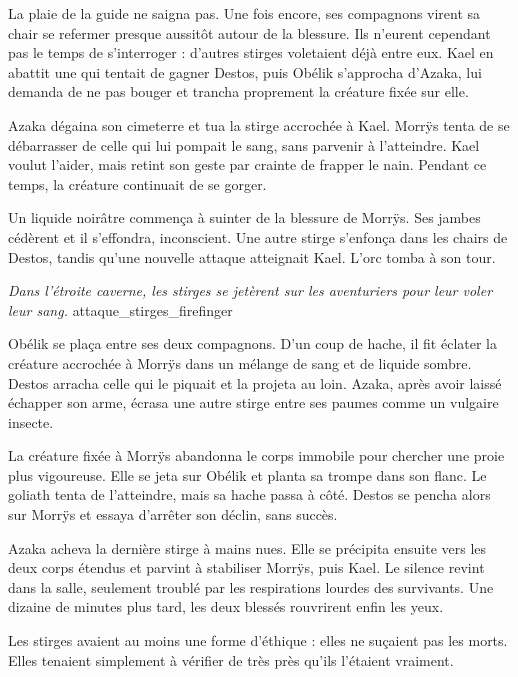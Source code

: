 La plaie de la guide ne saigna pas. Une fois encore, ses compagnons virent sa chair se refermer presque aussitôt autour de la blessure. Ils n'eurent cependant pas le temps de s'interroger : d'autres stirges voletaient déjà entre eux. Kael en abattit une qui tentait de gagner Destos, puis Obélik s'approcha d'Azaka, lui demanda de ne pas bouger et trancha proprement la créature fixée sur elle.

Azaka dégaina son cimeterre et tua la stirge accrochée à Kael. Morrÿs tenta de se débarrasser de celle qui lui pompait le sang, sans parvenir à l'atteindre. Kael voulut l'aider, mais retint son geste par crainte de frapper le nain. Pendant ce temps, la créature continuait de se gorger.

Un liquide noirâtre commença à suinter de la blessure de Morrÿs. Ses jambes cédèrent et il s'effondra, inconscient. Une autre stirge s'enfonça dans les chairs de Destos, tandis qu'une nouvelle attaque atteignait Kael. L'orc tomba à son tour.

{\textit{Dans l'étroite caverne, les stirges se jetèrent sur les aventuriers pour leur voler leur sang.}}
{attaque_stirges_firefinger}

Obélik se plaça entre ses deux compagnons. D'un coup de hache, il fit éclater la créature accrochée à Morrÿs dans un mélange de sang et de liquide sombre. Destos arracha celle qui le piquait et la projeta au loin. Azaka, après avoir laissé échapper son arme, écrasa une autre stirge entre ses paumes comme un vulgaire insecte.

La créature fixée à Morrÿs abandonna le corps immobile pour chercher une proie plus vigoureuse. Elle se jeta sur Obélik et planta sa trompe dans son flanc. Le goliath tenta de l'atteindre, mais sa hache passa à côté. Destos se pencha alors sur Morrÿs et essaya d'arrêter son déclin, sans succès.

Azaka acheva la dernière stirge à mains nues. Elle se précipita ensuite vers les deux corps étendus et parvint à stabiliser Morrÿs, puis Kael. Le silence revint dans la salle, seulement troublé par les respirations lourdes des survivants. Une dizaine de minutes plus tard, les deux blessés rouvrirent enfin les yeux.

\begin{narrateur}
Les stirges avaient au moins une forme d'éthique : elles ne suçaient pas les morts. Elles tenaient simplement à vérifier de très près qu'ils l'étaient vraiment.
\end{narrateur}


